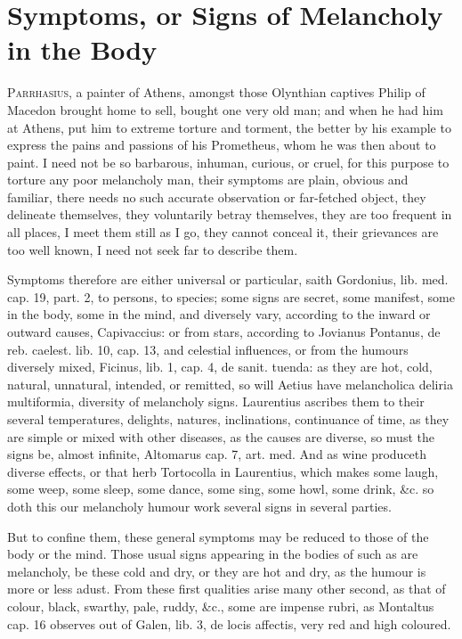 \chapter[Symptoms of Melancholy]{Symptoms, or Signs of Melancholy in the Body}\label{ch:symptoms}
{
\lettrine{P}{arrhasius}, a painter of Athens, amongst those Olynthian captives
Philip of Macedon brought home to sell, bought one very old man;
and when he had him at Athens, put him to extreme torture and torment,
the better by his example to express the pains and passions of his
Prometheus, whom he was then about to paint. I need not be so
barbarous, inhuman, curious, or cruel, for this purpose to torture any
poor melancholy man, their symptoms are plain, obvious and familiar,
there needs no such accurate observation or far-fetched object, they
delineate themselves, they voluntarily betray themselves, they are too
frequent in all places, I meet them still as I go, they cannot conceal
it, their grievances are too well known, I need not seek far to
describe them.

Symptoms therefore are either universal or particular, saith
Gordonius, lib. med. cap. 19, part. 2, to persons, to species; some
signs are secret, some manifest, some in the body, some in the mind,
and diversely vary, according to the inward or outward causes,
Capivaccius: or from stars, according to Jovianus Pontanus, de reb.
caelest. lib. 10, cap. 13, and celestial influences, or from the
humours diversely mixed, Ficinus, lib. 1, cap. 4, de sanit. tuenda: as
they are hot, cold, natural, unnatural, intended, or remitted, so will
Aetius have melancholica deliria multiformia, diversity of melancholy
signs. Laurentius ascribes them to their several temperatures,
delights, natures, inclinations, continuance of time, as they are
simple or mixed with other diseases, as the causes are diverse, so must
the signs be, almost infinite, Altomarus cap. 7, art. med. And as wine
produceth diverse effects, or that herb Tortocolla in Laurentius,
which makes some laugh, some weep, some sleep, some dance, some sing,
some howl, some drink, \&c. so doth this our melancholy humour work
several signs in several parties.

But to confine them, these general symptoms may be reduced to those of
the body or the mind. Those usual signs appearing in the bodies of such
as are melancholy, be these cold and dry, or they are hot and dry, as
the humour is more or less adust. From these first qualities
arise many other second, as that of colour, black, swarthy, pale,
ruddy, \&c., some are impense rubri, as Montaltus cap. 16 observes out
of Galen, lib. 3, de locis affectis, very red and high coloured.

}
